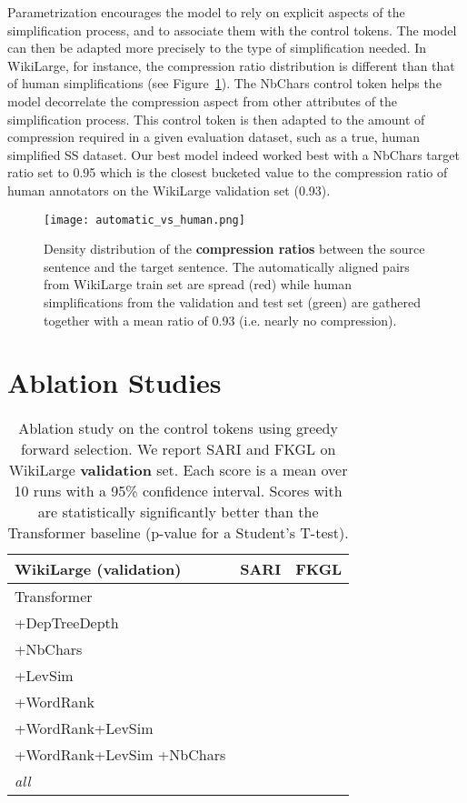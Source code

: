 \documentclass[10pt, a4paper]{article}
\begin{document}
Parametrization encourages the model to rely on explicit aspects of the simplification process, and to associate them with the control tokens. The model can then be adapted more precisely to the type of simplification needed.
In WikiLarge, for instance, the compression ratio distribution is different than that of human simplifications (see Figure~\ref{automatic_vs_human}).
The NbChars control token helps the model decorrelate the compression aspect from other attributes of the simplification process. This control token is then adapted to the amount of compression required in a given evaluation dataset, such as a true, human simplified SS dataset.
Our best model indeed worked best with a NbChars target ratio set to 0.95 which is the closest bucketed value to the compression ratio of human annotators on the WikiLarge validation set (0.93).


\begin{figure}
    \centering
    \texttt{[image: automatic\_vs\_human.png]}
        \caption{Density distribution of the \textbf{compression ratios} between the source sentence and the target sentence. The automatically aligned pairs from WikiLarge train set are spread (red) while human simplifications from the validation and test set (green) are gathered together with a mean ratio of 0.93 (i.e. nearly no compression). \label{automatic_vs_human}}
\end{figure}



\section{Ablation Studies}
\begin{table}
\small
\begin{tabular}{p{}ll}
\toprule
WikiLarge \textbf{(validation)} & SARI            & FKGL         \\
\midrule
    
Transformer &  &  \\
\midrule
+DepTreeDepth &  &  \\
+NbChars &  &  \\
+LevSim &  &  \\
+WordRank &  &  \\
\midrule
+WordRank+LevSim &  &  \\
\midrule
+WordRank+LevSim +NbChars &  &  \\
\midrule
\textit{all} &  &  \\

\bottomrule
\end{tabular}
\caption{Ablation study on the control tokens using greedy forward selection. We report SARI and FKGL on WikiLarge \textbf{validation} set. Each score is a mean over 10 runs with a 95\% confidence interval. Scores with  are statistically significantly better than the Transformer baseline (p-value  for a Student's T-test).} \label{ablation}
\end{table}
\end{document}
